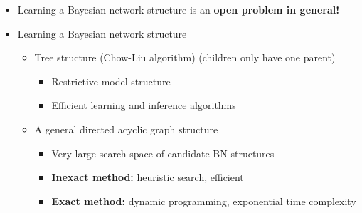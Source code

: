 \documentclass[10pt]{article}
\begin{document}
\begin{itemize}
	\item Learning a Bayesian network structure is an \textbf{open problem in general!}
	\item Learning a Bayesian network structure
	\begin{itemize}
	    \item Tree structure (Chow-Liu algorithm) (children only have one parent)
	    \begin{itemize}
	        \item Restrictive model structure
	        \item Efficient learning and inference algorithms
        \end{itemize}
        \item A general directed acyclic graph structure
        \begin{itemize}
	        \item Very large search space of candidate BN structures
	        \item \textbf{Inexact method:} heuristic search, efficient
	        \item \textbf{Exact method:} dynamic programming, exponential time complexity
        \end{itemize}
    \end{itemize}
\end{itemize}
\end{document}
